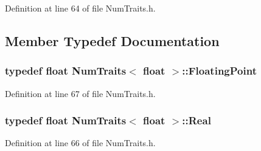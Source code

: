 Definition at line 64 of file Num\-Traits.\-h.



\subsection{Member Typedef Documentation}
\hypertarget{struct_num_traits_3_01float_01_4_a0305bf3998e6972bc49cf388375333c3}{
\subsubsection[{Floating\-Point}]{\setlength{\rightskip}{0pt plus 5cm}typedef {\bf float} {\bf Num\-Traits}$<$ {\bf float} $>$\-::{\bf Floating\-Point}}}\label{struct_num_traits_3_01float_01_4_a0305bf3998e6972bc49cf388375333c3}


Definition at line 67 of file Num\-Traits.\-h.

\hypertarget{struct_num_traits_3_01float_01_4_a225b66cb1450c9b1f69c63bd96ea8ca7}{
\subsubsection[{Real}]{\setlength{\rightskip}{0pt plus 5cm}typedef {\bf float} {\bf Num\-Traits}$<$ {\bf float} $>$\-::{\bf Real}}}\label{struct_num_traits_3_01float_01_4_a225b66cb1450c9b1f69c63bd96ea8ca7}


Definition at line 66 of file Num\-Traits.\-h.



